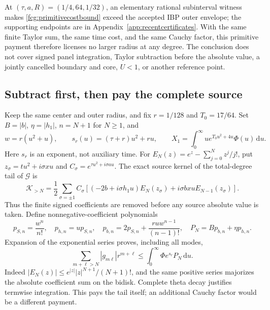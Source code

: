 \documentclass[11pt]{article}
\numberwithin{equation}{section}
\newcommand{\dd}{\,\mathrm d}
\begin{document}
At $(\tau,a,R)=(1/4,64,1/32)$, an elementary rational subinterval
witness makes \eqref{fcg:primitivecostbound} exceed the accepted IBP
outer envelope; the supporting endpoints are in
Appendix~\ref{app:recentcertificates}. With the same finite Taylor sum,
the same time cost, and the same Cauchy factor, this primitive payment
therefore licenses no larger radius at any degree. The conclusion
does not cover signed panel integration, Taylor subtraction before
the absolute value, a jointly cancelled boundary and core, $U<1$,
or another reference point.

\subsection{Subtract first, then pay the complete source}

Keep the same center and outer radius, and fix $r=1/128$ and
$T_0=17/64$. Set $B=|b|$, $\eta=|h_1|$, $n=N+1$ for $N\ge1$, and
\[
 w=r(u^2+u),\qquad s_r(u)=(\tau+r)u^2+ru,\qquad
 X_1=\int_0^\infty u e^{T_0u^2+4u}\Phi(u)\dd u.
\]
Here $s_r$ is an exponent, not auxiliary time. For
$E_N(z)=e^z-\sum_{j=0}^Nz^j/j!$, put
$z_\sigma=tu^2+i\sigma xu$ and $C_\sigma=e^{\tau u^2+i\sigma au}$.
The exact source kernel of the total-degree tail of $\mathcal G$ is
\begin{equation}\label{fcg:subtractedkernel}
 \mathscr K_{>N}=\frac12\sum_{\sigma=\pm1}C_\sigma
 \left[(-2b+i\sigma h_1u)E_N(z_\sigma)
               +i\sigma bxu E_{N-1}(z_\sigma)\right].
\end{equation}
Thus the finite signed coefficients are removed before any source
absolute value is taken. Define nonnegative-coefficient polynomials
\begin{equation}\label{fcg:tailpolynomials}
 p_{S,n}=\frac{w^n}{n!},\quad p_{h,n}=u p_{S,n},\quad
 p_{b,n}=2p_{S,n}+\frac{ruw^{n-1}}{(n-1)!},\quad
 P_N=Bp_{b,n}+\eta p_{h,n}.
\end{equation}
Expansion of the exponential series proves, including all modes,
\begin{equation}\label{fcg:fullcoefficienttail}
 \sum_{m+\ell>N}|g_{m\ell}|r^{m+\ell}
 \le\int_0^\infty\Phi e^{s_r}P_N\dd u.
\end{equation}
Indeed $|E_N(z)|\le e^{|z|}|z|^{N+1}/(N+1)!$, and the same
positive series majorizes the absolute coefficient sum on the bidisk.
Complete theta decay justifies termwise integration. This pays the
tail itself; an additional Cauchy factor would be a different payment.
\end{document}
